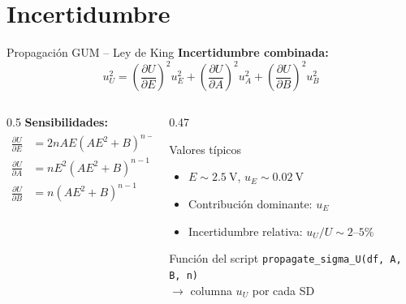 \documentclass[aspectratio=169,12pt]{beamer}
\begin{document}
\section{Incertidumbre}

\begin{frame}{Propagación GUM -- Ley de King}
	\textbf{Incertidumbre combinada:}
	\begin{equation*}
		u_U^2 = \left(\frac{\partial U}{\partial E}\right)^2 u_E^2
		+ \left(\frac{\partial U}{\partial A}\right)^2 u_A^2
		+ \left(\frac{\partial U}{\partial B}\right)^2 u_B^2
	\end{equation*}

	\vspace{0.3em}
	\begin{columns}
		\begin{column}{0.5\textwidth}
			\textbf{Sensibilidades:}
			\begin{align*}
				\frac{\partial U}{\partial E}
				 & = 2nAE(AE^2+B)^{n-1} \\
				\frac{\partial U}{\partial A}
				 & = nE^2(AE^2+B)^{n-1} \\
				\frac{\partial U}{\partial B}
				 & = n(AE^2+B)^{n-1}
			\end{align*}
		\end{column}
		\begin{column}{0.47\textwidth}
			\begin{exampleblock}{Valores típicos}
				\begin{itemize}\small
					\item $E \sim \SI{2.5}{\volt}$,
					      $u_E \sim \SI{0.02}{\volt}$
					\item Contribución dominante: $u_E$
					\item Incertidumbre relativa:
					      $u_U/U \sim 2$--$5\%$
				\end{itemize}
			\end{exampleblock}
			\vspace{0.2em}
			\begin{block}{Función del script}
				\texttt{propagate\_sigma\_U(df, A, B, n)}\\
				$\to$ columna $u_U$ por cada SD
			\end{block}
		\end{column}
	\end{columns}
\end{frame}
\end{document}
